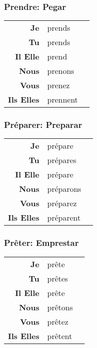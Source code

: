 \documentclass{subfiles}
\begin{document}
\begin{multicols*}{3}
        \subsubsection{Prendre: Pegar}
            \begin{tabular}{r l r}
                \textbf{Je}        & prends   &\\
                \textbf{Tu}        & prends   &\\
                \textbf{Il Elle}   & prend    &\\
                \textbf{Nous}      & prenons  &\\
                \textbf{Vous}      & prenez   &\\
                \textbf{Ils Elles} & prennent &
            \end{tabular}

        \subsubsection{Préparer: Preparar}
            \begin{tabular}{r l r}
                \textbf{Je}        & prépare    &\\
                \textbf{Tu}        & prépares   &\\
                \textbf{Il Elle}   & prépare    &\\
                \textbf{Nous}      & préparons  &\\
                \textbf{Vous}      & préparez   &\\
                \textbf{Ils Elles} & préparent  &
            \end{tabular}

        \subsubsection{Prêter: Emprestar}
            \begin{tabular}{r l r}
                \textbf{Je}        & prête   &\\
                \textbf{Tu}        & prêtes  &\\
                \textbf{Il Elle}   & prête   &\\
                \textbf{Nous}      & prêtons &\\
                \textbf{Vous}      & prêtez  &\\
                \textbf{Ils Elles} & prêtent &
            \end{tabular}


\end{multicols*}
\end{document}
